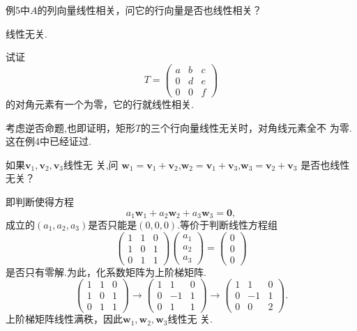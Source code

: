 ﻿\documentclass{book} \usepackage{exsheets} \usepackage{xeCJK}
\begin{document}
\begin{question}
  例5中$A$的列向量线性相关，问它的行向量是否也线性相关？
\end{question}
\begin{solution}
  线性无关.
\end{solution}
\begin{question}
  试证
$$
T=
\begin{pmatrix}
  a&b&c\\
  0&d&e\\
  0&0&f
\end{pmatrix}
$$
的对角元素有一个为零，它的行就线性相关.
\end{question}
\begin{solution}
  考虑逆否命题,也即证明，矩形$T$的三个行向量线性无关时，对角线元素全不
  为零.这在例4中已经证过.
\end{solution}
\begin{question}
  如果$\mathbf{v}_1,\mathbf{v}_2,\mathbf{v}_3$线性无
  关,问
  $\mathbf{w}_1=\mathbf{v}_1+\mathbf{v}_2$,$\mathbf{w}_2=\mathbf{v}_1+\mathbf{v}_3$,$\mathbf{w}_3=\mathbf{v}_2+\mathbf{v}_3$
  是否也线性无关？
\end{question}
\begin{solution}
  即判断使得方程
$$
a_1\mathbf{w}_1+a_2\mathbf{w}_2+a_3\mathbf{w}_3=\mathbf{0},
$$
成立的$(a_1,a_2,a_3)$是否只能是$(0,0,0)$.等价于判断线性方程组
$$
\begin{pmatrix}
  1&1&0\\
  1&0&1\\
  0&1&1
\end{pmatrix}
\begin{pmatrix}
  a_1\\
  a_2\\
  a_3
\end{pmatrix}=
\begin{pmatrix}
  0\\
  0\\
  0
\end{pmatrix}
$$
是否只有零解.为此，化系数矩阵为上阶梯矩阵.
$$
\begin{pmatrix}
  1&1&0\\
  1&0&1\\
  0&1&1
\end{pmatrix}\to
\begin{pmatrix}
  1&1&0\\
  0&-1&1\\
  0&1&1
\end{pmatrix}\to
\begin{pmatrix}
  1&1&0\\
  0&-1&1\\
  0&0&2
\end{pmatrix}.
$$
上阶梯矩阵线性满秩，因此$\mathbf{w}_1,\mathbf{w}_2,\mathbf{w}_3$线性无
关.
\end{solution}
\end{document}
